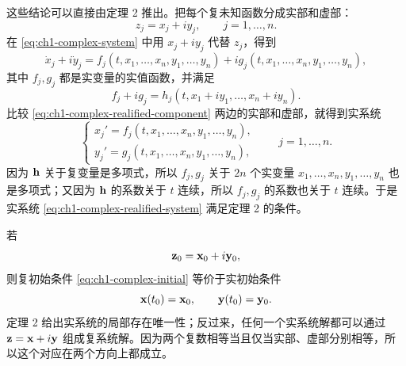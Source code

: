 这些结论可以直接由定理 2 推出。把每个复未知函数分成实部和虚部：
\begin{equation}
 z_j=x_j+iy_j,
 \qquad j=1,\ldots,n.
 \label{eq:ch1-complex-real-components}
\end{equation}
在 \eqref{eq:ch1-complex-system} 中用 \(x_j+iy_j\) 代替 \(z_j\)，得到
\begin{equation}
 \dot x_j+i\dot y_j
 =f_j(t,x_1,\ldots,x_n,y_1,\ldots,y_n)
 +ig_j(t,x_1,\ldots,x_n,y_1,\ldots,y_n),
 \label{eq:ch1-complex-realified-component}
\end{equation}
其中 \(f_j,g_j\) 都是实变量的实值函数，并满足
\begin{equation}
 f_j+ig_j
 =h_j(t,x_1+iy_1,\ldots,x_n+iy_n).
 \label{eq:ch1-complex-real-part-definition}
\end{equation}
比较 \eqref{eq:ch1-complex-realified-component} 两边的实部和虚部，就得到实系统
\begin{equation}
 \begin{cases}
  x_j'=f_j(t,x_1,\ldots,x_n,y_1,\ldots,y_n),\\
  y_j'=g_j(t,x_1,\ldots,x_n,y_1,\ldots,y_n),
 \end{cases}
 \qquad j=1,\ldots,n.
 \label{eq:ch1-complex-realified-system}
\end{equation}
因为 \(\vect{h}\) 关于复变量是多项式，所以 \(f_j,g_j\) 关于 \(2n\) 个实变量 \(x_1,\ldots,x_n,y_1,\ldots,y_n\) 也是多项式；又因为 \(\vect{h}\) 的系数关于 \(t\) 连续，所以 \(f_j,g_j\) 的系数也关于 \(t\) 连续。于是实系统 \eqref{eq:ch1-complex-realified-system} 满足定理 2 的条件。

若
\[
 \vect{z}_0=\vect{x}_0+i\vect{y}_0,
\]
则复初始条件 \eqref{eq:ch1-complex-initial} 等价于实初始条件
\begin{equation}
 \vect{x}(t_0)=\vect{x}_0,
 \qquad
 \vect{y}(t_0)=\vect{y}_0.
 \label{eq:ch1-complex-real-initial}
\end{equation}
定理 2 给出实系统的局部存在唯一性；反过来，任何一个实系统解都可以通过 \(\vect{z}=\vect{x}+i\vect{y}\) 组成复系统解。因为两个复数相等当且仅当实部、虚部分别相等，所以这个对应在两个方向上都成立。

